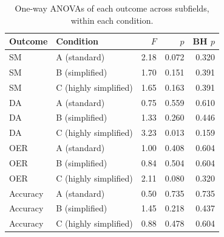 \begin{table}[H]
\caption{One-way ANOVAs of each outcome across subfields, within each condition.}
\label{tab:subfield:tests}
\centering
\begin{tabular}{llrrr}
\toprule
Outcome & Condition & $F$ & $p$ & BH $p$ \\
\midrule
SM & A (standard) & 2.18 & 0.072 & 0.320 \\
SM & B (simplified) & 1.70 & 0.151 & 0.391 \\
SM & C (highly simplified) & 1.65 & 0.163 & 0.391 \\
DA & A (standard) & 0.75 & 0.559 & 0.610 \\
DA & B (simplified) & 1.33 & 0.260 & 0.446 \\
DA & C (highly simplified) & 3.23 & 0.013 & 0.159 \\
OER & A (standard) & 1.00 & 0.408 & 0.604 \\
OER & B (simplified) & 0.84 & 0.504 & 0.604 \\
OER & C (highly simplified) & 2.11 & 0.080 & 0.320 \\
Accuracy & A (standard) & 0.50 & 0.735 & 0.735 \\
Accuracy & B (simplified) & 1.45 & 0.218 & 0.437 \\
Accuracy & C (highly simplified) & 0.88 & 0.478 & 0.604 \\
\bottomrule
\end{tabular}
\end{table}
